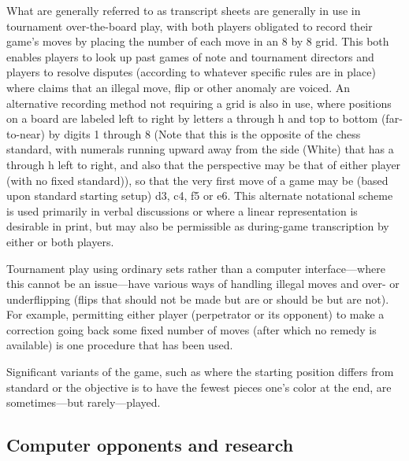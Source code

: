 \documentclass[a4paper]{report}
\begin{document}
\par
What are generally referred to as transcript sheets are generally in use in tournament over-the-board play, with both players obligated to record their game's moves by placing the number of each move in an 8 by 8 grid. This both enables players to look up past games of note and tournament directors and players to resolve disputes (according to whatever specific rules are in place) where claims that an illegal move, flip or other anomaly are voiced. An alternative recording method not requiring a grid is also in use, where positions on a board are labeled left to right by letters a through h and top to bottom (far-to-near) by digits 1 through 8 (Note that this is the opposite of the chess standard, with numerals running upward away from the side (White) that has a through h left to right, and also that the perspective may be that of either player (with no fixed standard)), so that the very first move of a game may be (based upon standard starting setup) d3, c4, f5 or e6. This alternate notational scheme is used primarily in verbal discussions or where a linear representation is desirable in print, but may also be permissible as during-game transcription by either or both players. 
\par
Tournament play using ordinary sets rather than a computer interface—where this cannot be an issue—have various ways of handling illegal moves and over- or underflipping (flips that should not be made but are or should be but are not). For example, permitting either player (perpetrator or its opponent) to make a correction going back some fixed number of moves (after which no remedy is available) is one procedure that has been used. 
\par
Significant variants of the game, such as where the starting position differs from standard or the objective is to have the fewest pieces one's color at the end, are sometimes—but rarely—played. 
\subsection{Computer opponents and research}
\end{document}

